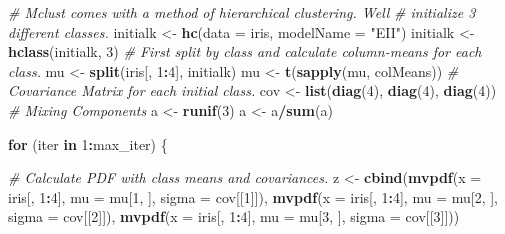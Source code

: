 \documentclass[12pt]{article}
\newenvironment{Shaded}{\begin{snugshade}}{\end{snugshade}}
\newcommand{\AttributeTok}[1]{\textcolor[rgb]{0.13,0.29,0.53}{#1}}
\newcommand{\CommentTok}[1]{\textcolor[rgb]{0.56,0.35,0.01}{\textit{#1}}}
\newcommand{\ControlFlowTok}[1]{\textcolor[rgb]{0.13,0.29,0.53}{\textbf{#1}}}
\newcommand{\DecValTok}[1]{\textcolor[rgb]{0.00,0.00,0.81}{#1}}
\newcommand{\FunctionTok}[1]{\textcolor[rgb]{0.13,0.29,0.53}{\textbf{#1}}}
\newcommand{\NormalTok}[1]{#1}
\newcommand{\OtherTok}[1]{\textcolor[rgb]{0.56,0.35,0.01}{#1}}
\newcommand{\SpecialCharTok}[1]{\textcolor[rgb]{0.81,0.36,0.00}{\textbf{#1}}}
\newcommand{\StringTok}[1]{\textcolor[rgb]{0.31,0.60,0.02}{#1}}
\begin{document}
\begin{Shaded}
\begin{Highlighting}[]
\CommentTok{\# Mclust comes with a method of hierarchical clustering. We\textquotesingle{}ll}
\CommentTok{\# initialize 3 different classes.}
\NormalTok{initialk }\OtherTok{\textless{}{-}} \FunctionTok{hc}\NormalTok{(}\AttributeTok{data =}\NormalTok{ iris, }\AttributeTok{modelName =} \StringTok{"EII"}\NormalTok{)}
\NormalTok{initialk }\OtherTok{\textless{}{-}} \FunctionTok{hclass}\NormalTok{(initialk, }\DecValTok{3}\NormalTok{)}
\CommentTok{\# First split by class and calculate column{-}means for each class.}
\NormalTok{mu }\OtherTok{\textless{}{-}} \FunctionTok{split}\NormalTok{(iris[, }\DecValTok{1}\SpecialCharTok{:}\DecValTok{4}\NormalTok{], initialk)}
\NormalTok{mu }\OtherTok{\textless{}{-}} \FunctionTok{t}\NormalTok{(}\FunctionTok{sapply}\NormalTok{(mu, colMeans))}
\CommentTok{\# Covariance Matrix for each initial class.}
\NormalTok{cov }\OtherTok{\textless{}{-}} \FunctionTok{list}\NormalTok{(}\FunctionTok{diag}\NormalTok{(}\DecValTok{4}\NormalTok{), }\FunctionTok{diag}\NormalTok{(}\DecValTok{4}\NormalTok{), }\FunctionTok{diag}\NormalTok{(}\DecValTok{4}\NormalTok{))}
\CommentTok{\# Mixing Components}
\NormalTok{a }\OtherTok{\textless{}{-}} \FunctionTok{runif}\NormalTok{(}\DecValTok{3}\NormalTok{)}
\NormalTok{a }\OtherTok{\textless{}{-}}\NormalTok{ a}\SpecialCharTok{/}\FunctionTok{sum}\NormalTok{(a)}

\ControlFlowTok{for}\NormalTok{ (iter }\ControlFlowTok{in} \DecValTok{1}\SpecialCharTok{:}\NormalTok{max\_iter) \{}
  
\CommentTok{\# Calculate PDF with class means and covariances.}
\NormalTok{z }\OtherTok{\textless{}{-}} \FunctionTok{cbind}\NormalTok{(}\FunctionTok{mvpdf}\NormalTok{(}\AttributeTok{x =}\NormalTok{ iris[, }\DecValTok{1}\SpecialCharTok{:}\DecValTok{4}\NormalTok{], }\AttributeTok{mu =}\NormalTok{ mu[}\DecValTok{1}\NormalTok{, ], }\AttributeTok{sigma =}\NormalTok{ cov[[}\DecValTok{1}\NormalTok{]]), }\FunctionTok{mvpdf}\NormalTok{(}\AttributeTok{x =}\NormalTok{ iris[, }
    \DecValTok{1}\SpecialCharTok{:}\DecValTok{4}\NormalTok{], }\AttributeTok{mu =}\NormalTok{ mu[}\DecValTok{2}\NormalTok{, ], }\AttributeTok{sigma =}\NormalTok{ cov[[}\DecValTok{2}\NormalTok{]]), }\FunctionTok{mvpdf}\NormalTok{(}\AttributeTok{x =}\NormalTok{ iris[, }\DecValTok{1}\SpecialCharTok{:}\DecValTok{4}\NormalTok{], }\AttributeTok{mu =}\NormalTok{ mu[}\DecValTok{3}\NormalTok{, }
\NormalTok{    ], }\AttributeTok{sigma =}\NormalTok{ cov[[}\DecValTok{3}\NormalTok{]]))}


\end{Highlighting}
\end{Shaded}
\end{document}
